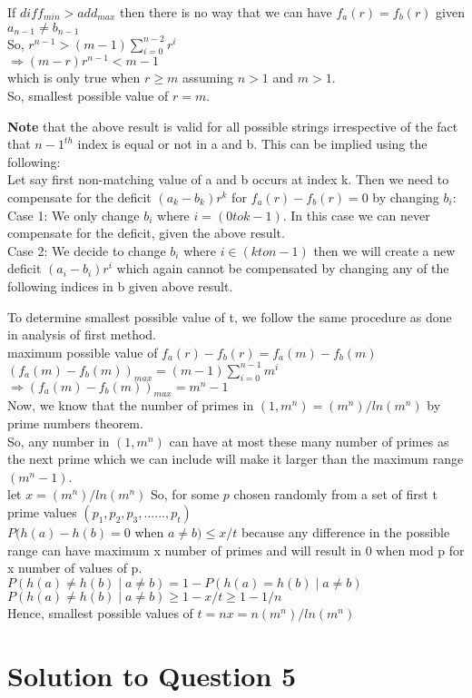 \documentclass[11pt]{article}
\begin{document}
If $diff_{min} > add_{max}$ then there is no way that we can have $f_a(r) = f_b(r)$ given $a_{n-1} \neq b_{n-1}$ \\
So, $r^{n-1} > (m-1) \sum_{i=0}^{n-2}r^i$ \\
$\Rightarrow (m-r)r^{n-1} < m-1$ \\
which is only true when $r \geq m$ assuming $n > 1$ and $m > 1$.\\
So, smallest possible value of $r = m$.

\textbf{Note} that the above result is valid for all possible strings irrespective of the fact that ${n-1}^{th}$ index is equal or not 
in a and b. This can be implied using the following: \\
Let say first non-matching value of a and b  occurs at index k. Then we need to compensate for the deficit  $(a_k - b_k) r^k$ for 
$f_a(r) - f_b(r) = 0$ by changing $b_i$: \\
Case 1: We only change $b_i$ where $i = (0 to k-1)$. In this case we  can never compensate for the deficit, given the above result.\\
Case 2: We decide to change $b_i$ where $ i \in (k to n-1)$ then we will create a new deficit $(a_i-b_i)r^i$ which again cannot be 
compensated by changing any of the following indices in b given above result.

To determine smallest possible value of t, we follow the same procedure as done in analysis of first method.\\
maximum possible value of $f_a(r) - f_b(r) = f_a(m) - f_b(m)$ \\
$(f_a(m) - f_b(m))_{max} = (m-1) \sum_{i=0}^{n-1} m^i$ \\
$ \Rightarrow  (f_a(m) - f_b(m))_{max} = m^n-1$ \\
Now, we know that the number of primes in $(1, m^n) = (m^n)/ln(m^n)$ by prime numbers theorem.\\
So, any number in $(1, m^n)$ can have at most these many  number of primes as the next prime which we can include will make
it larger than the maximum range $(m^n-1)$.\\
let $x =  (m^n)/ln(m^n)$
So, for some $p$ chosen randomly from a set of first t prime values $(p_1,p_2,p_3,......,p_t)$ \\
$P(h(a) - h(b) = 0$ when $a \neq b) \leq x/t$ because any difference in the possible range can have maximum x number of primes
and will result in 0 when mod p for x number of values of p.\\
$P(h(a) \neq h(b) \mid a \neq b) = 1 - P(h(a) = h(b) \mid a \neq b)$ \\
$P(h(a) \neq h(b) \mid a \neq b) \geq 1- x/t  \geq 1 - 1/n$ \\
Hence, smallest possible values of $t = nx = n(m^n)/ln(m^n)$ \\

\newpage
\section{Solution to Question 5}
\end{document}
